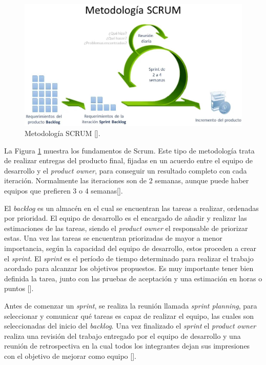 \begin{figure}[htbp]
\centering
\includegraphics[scale=0.3]{Graphics/SCRUM}
\caption{Metodología SCRUM [\cite{94}].}
\label{fig:SCRUM}
\end{figure}

La Figura \ref{fig:SCRUM} muestra los fundamentos de Scrum. Este tipo de metodología trata de realizar entregas del producto final, fijadas en un acuerdo entre el equipo de desarrollo y el \textit{product owner}, para conseguir un resultado completo con cada iteración. Normalmente las iteraciones son de 2 semanas, aunque puede haber equipos que prefieren 3 o 4 semanas[\cite{92}].

El \textit{backlog} es un almacén en el cual se encuentran las tareas a realizar, ordenadas por prioridad. El equipo de desarrollo es el encargado de añadir y realizar las estimaciones de las tareas, siendo el \textit{product owner} el responsable de priorizar estas. Una vez las tareas se encuentran priorizadas de mayor a menor importancia, según la capacidad del equipo de desarrollo, estos proceden a crear el \textit{sprint}. El \textit{sprint} es el período de tiempo determinado para realizar el trabajo acordado para alcanzar los objetivos propuestos. Es muy importante tener bien definida la tarea, junto con las pruebas de aceptación y una estimación en horas o puntos [\cite{92,93}].

Antes de comenzar un \textit{sprint}, se realiza la reunión llamada \textit{sprint planning}, para seleccionar y comunicar qué tareas es capaz de realizar el equipo, las cuales son seleccionadas del inicio del \textit{backlog}. Una vez finalizado el \textit{sprint} el \textit{product owner} realiza una revisión del trabajo entregado por el equipo de desarrollo y una reunión de retrospectiva en la cual todos los integrantes dejan sus impresiones con el objetivo de mejorar como equipo [\cite{93}].

